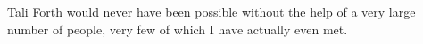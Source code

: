 Tali Forth would never have been possible without the help of a very large
number of people, very few of which I have actually even met.


